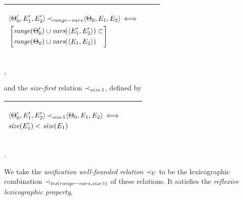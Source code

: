 \documentclass[runningheads]{llncs}
\DeclareMathOperator{\uiff}{\iff}
\DeclareMathOperator{\lex}{\emph{lex}}
\begin{document}
  \begin{center}
  \begin{tabular}{|m{}|m{}||m{}|}
\hline
\begin{center}
{$\begin{aligned}
    &\langle \Thet{0}', \E{1}', \E{2}' \rangle 
\,\expsub{\prec}{range-vars}
    \langle \Thet{0}, \E{1}, \E{2} \rangle \uiff \\
    &\left[\begin{aligned}
     &\range(\Thet{0}') \cup \vars(\langle \E{1}', \E{2}'\rangle) \subset \\
     &\range(\Thet{0}) \cup \vars(\langle \E{1}, \E{2}\rangle)
     \end{aligned}\right]
\end{aligned}$} \hspace{1cm} 
\end{center}& &  \\  \hline
\end{tabular},
\end{center}
and the \emph{size-first} relation ${\prec}_{size\, 1}$, defined by
  \begin{center}
  \begin{tabular}{|m{}|m{}||m{}|}
\hline
\begin{center}
{$\begin{aligned}
    &\langle \Thet{0}', \E{1}', \E{2}' \rangle 
\,\expsub{\prec}{\size\, 1}
    \langle \Thet{0}, \E{1}, \E{2} \rangle \uiff \\
    &\size(\E{1}') < \size(\E{1})
\end{aligned}$} \hspace{1cm} 
\end{center}& &  \\  \hline
\end{tabular}.
\end{center}
We take the \emph{unification well-founded relation} ${\prec}_{U}$ to be the lexicographic combination 
$\expsub{\prec}{\lex(range-vars, \size \, 1)}$ of these relations.  It satisfies the
\emph{reflexive lexicographic property},  
\end{document}
